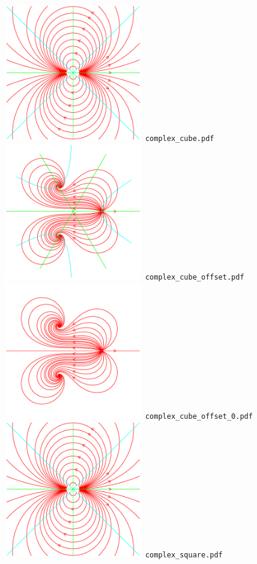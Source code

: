 \documentclass[a4paper]{amsart}
\begin{document}
\includegraphics[width=6cm]{complex_cube.pdf}\verb+ complex_cube.pdf+\\
\includegraphics[width=6cm]{complex_cube_offset.pdf}\verb+ complex_cube_offset.pdf+\\
\includegraphics[width=6cm]{complex_cube_offset_0.pdf}\verb+ complex_cube_offset_0.pdf+\\
\includegraphics[width=6cm]{complex_square.pdf}\verb+ complex_square.pdf+\\
\end{document}
